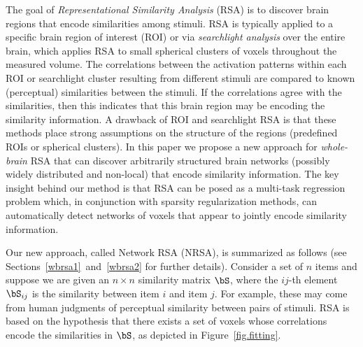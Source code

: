 The goal of \emph{Representational Similarity Analysis} (RSA) \cite{RSA} is
to discover brain regions that encode similarities among stimuli. RSA is
typically applied to a specific brain region of interest (ROI) or via \emph{searchlight analysis} \cite{searchlight}  over the entire brain, which applies RSA to small spherical clusters of voxels throughout the measured volume.  The correlations between the activation patterns within each ROI or searchlight cluster resulting from different stimuli are compared to known (perceptual) similarities between the stimuli.  If the correlations agree with the similarities, then this indicates that this brain region may be encoding the similarity information.  A drawback of ROI and searchlight RSA is that these methods place strong assumptions on the structure of the regions (predefined ROIs or spherical clusters).   In this paper we propose a new approach for {\em whole-brain} RSA that can discover arbitrarily structured brain networks (possibly widely
distributed and non-local) that encode similarity information. The key insight behind our method is that RSA can be posed as a multi-task regression problem which, in conjunction with sparsity regularization methods, can automatically detect networks of voxels that appear to jointly encode similarity information.

Our new approach, called Network RSA (NRSA), is summarized as follows (see Sections~\ref{wbrsa1}~and~\ref{wbrsa2} for further details).  Consider a set of $n$ items and suppose we are given an $n \times n$ similarity matrix $\bS$, where the $ij$-th element $\bS_{ij}$ is the similarity\cite{similarity} between item $i$ and item $j$. For example, these may come from human judgments of perceptual similarity between pairs of stimuli.  RSA is based on the hypothesis that there exists a set of voxels whose correlations encode the similarities in $\bS$, as depicted in Figure~\ref{fig.fitting}.


